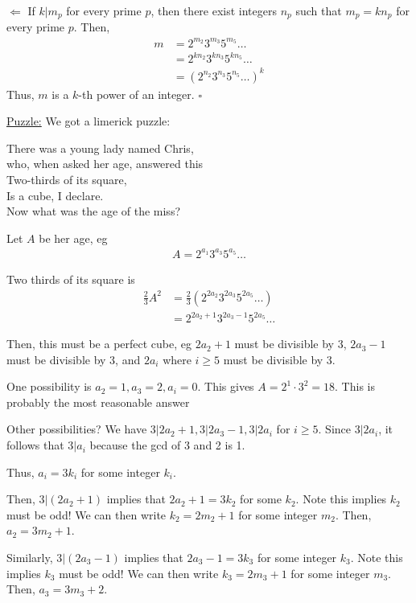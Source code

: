 \documentclass{article}
\newcommand*{\qed}{\hfill$\square$}%
\begin{document}
$\Leftarrow$ If $k|m_p$ for every prime $p$, then there exist integers $n_p$ such that $m_p=kn_p$ for every prime $p$. Then, \begin{align*}
    m &= 2^{m_2}3^{m_3}5^{m_5}\dots \\
      &= 2^{kn_2}3^{kn_3}5^{kn_5}\dots \\
      &= (2^{n_2}3^{n_3}5^{n_5}\dots)^k
\end{align*}Thus, $m$ is a $k$-th power of an integer. \qed

\underline{Puzzle:} We got a limerick puzzle:

\begin{center}
    There was a young lady named Chris,\\
    who, when asked her age, answered this\\
    Two-thirds of its square,\\
    Is a cube, I declare.\\
    Now what was the age of the miss?
\end{center}

Let $A$ be her age, eg \begin{align*}
    A=2^{a_1}3^{a_3}5^{a_5}\dots
\end{align*}

Two thirds of its square is \begin{align*}
    \frac{2}{3}A^2 &= \frac{2}{3}(2^{2a_2}3^{2a_3}5^{2a_5}\dots) \\
    &= 2^{2a_2+1}3^{2a_3-1}5^{2a_5}\dots
\end{align*}

Then, this must be a perfect cube, eg $2a_2+1$ must be divisible by 3, $2a_3-1$ must be divisible by 3, and $2a_i$ where $i\geq 5$ must be divisible by 3.

One possibility is $a_2=1, a_3=2, a_i=0$. This gives $A=2^1\cdot 3^2=18$. This is probably the most reasonable answer

Other possibilities? We have $3|2a_2+1, 3|2a_3-1, 3|2a_i$ for $i\geq 5$. Since $3|2a_i$, it follows that $3|a_i$ because the gcd of 3 and 2 is 1. 

Thus, $a_i=3k_i$ for some integer $k_i$.

Then, $3|(2a_2+1)$ implies that $2a_2+1=3k_2$ for some $k_2$. Note this implies $k_2$ must be odd! We can then write $k_2=2m_2+1$ for some integer $m_2$. Then, $a_2=3m_2+1$.

Similarly, $3|(2a_3-1)$ implies that $2a_3-1=3k_3$ for some integer $k_3$. Note this implies $k_3$ must be odd! We can then write $k_3=2m_3+1$ for some integer $m_3$. Then, $a_3=3m_3+2$.
\end{document}
